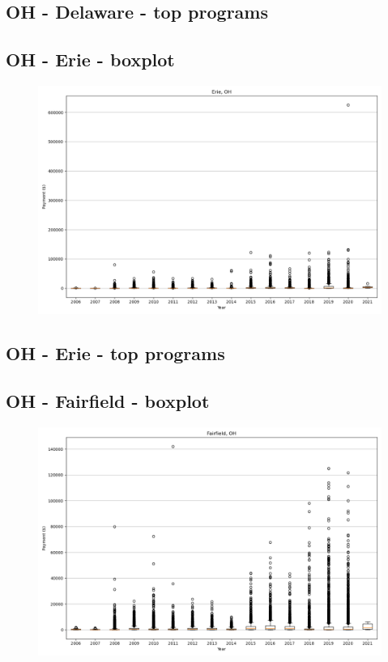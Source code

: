 \subsection*{OH - Delaware - top programs}

\newpage
\subsection*{OH - Erie - boxplot}
\begin{figure}[h]
\centering
\includegraphics[width=7in]{../output/boxplots/counties/Erie-OH_boxplot.png}
\end{figure}


\subsection*{OH - Erie - top programs}

\newpage
\subsection*{OH - Fairfield - boxplot}
\begin{figure}[h]
\centering
\includegraphics[width=7in]{../output/boxplots/counties/Fairfield-OH_boxplot.png}
\end{figure}


